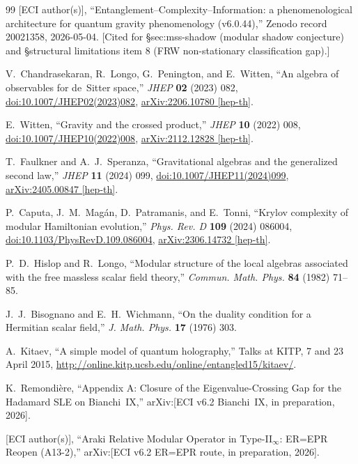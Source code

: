 \documentclass[12pt,a4paper]{article}
\theoremstyle{definition}
\begin{document}
\begin{thebibliography}{99}
[ECI author(s)],
``Entanglement--Complexity--Information: a phenomenological architecture
for quantum gravity phenomenology (v6.0.44),''
Zenodo record 20021358, 2026-05-04.
[Cited for \S sec:mss-shadow (modular shadow conjecture) and
\S structural limitations item 8 (FRW non-stationary classification gap).]

V.~Chandrasekaran, R.~Longo, G.~Penington, and E.~Witten,
``An algebra of observables for de~Sitter space,''
\textit{JHEP} \textbf{02} (2023) 082,
\href{https://doi.org/10.1007/JHEP02(2023)082}{doi:10.1007/JHEP02(2023)082},
\href{https://arxiv.org/abs/2206.10780}{arXiv:2206.10780 [hep-th]}.

E.~Witten,
``Gravity and the crossed product,''
\textit{JHEP} \textbf{10} (2022) 008,
\href{https://doi.org/10.1007/JHEP10(2022)008}{doi:10.1007/JHEP10(2022)008},
\href{https://arxiv.org/abs/2112.12828}{arXiv:2112.12828 [hep-th]}.

T.~Faulkner and A.~J.~Speranza,
``Gravitational algebras and the generalized second law,''
\textit{JHEP} \textbf{11} (2024) 099,
\href{https://doi.org/10.1007/JHEP11(2024)099}{doi:10.1007/JHEP11(2024)099},
\href{https://arxiv.org/abs/2405.00847}{arXiv:2405.00847 [hep-th]}.

P.~Caputa, J.~M.~Mag\'{a}n, D.~Patramanis, and E.~Tonni,
``Krylov complexity of modular Hamiltonian evolution,''
\textit{Phys. Rev. D} \textbf{109} (2024) 086004,
\href{https://doi.org/10.1103/PhysRevD.109.086004}{doi:10.1103/PhysRevD.109.086004},
\href{https://arxiv.org/abs/2306.14732}{arXiv:2306.14732 [hep-th]}.

P.~D.~Hislop and R.~Longo,
``Modular structure of the local algebras associated with the free
massless scalar field theory,''
\textit{Commun. Math. Phys.} \textbf{84} (1982) 71--85.

J.~J.~Bisognano and E.~H.~Wichmann,
``On the duality condition for a Hermitian scalar field,''
\textit{J. Math. Phys.} \textbf{17} (1976) 303.

A.~Kitaev, ``A simple model of quantum holography,''
Talks at KITP, 7 and 23 April 2015,
\url{http://online.kitp.ucsb.edu/online/entangled15/kitaev/}.

K.~Remondi\`{e}re,
``Appendix A: Closure of the Eigenvalue-Crossing Gap for the Hadamard SLE on Bianchi~IX,''
arXiv:[ECI v6.2 Bianchi~IX, in preparation, 2026].

[ECI author(s)],
``Araki Relative Modular Operator in Type-II$_\infty$: ER=EPR Reopen (A13-2),''
arXiv:[ECI v6.2 ER=EPR route, in preparation, 2026].

\end{thebibliography}
\end{document}
